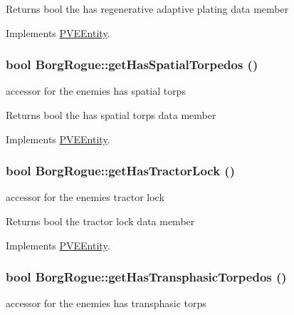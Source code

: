 \begin{DoxyReturn}{Returns}
bool the has regenerative adaptive plating data member 
\end{DoxyReturn}


Implements \hyperlink{classPVEEntity}{PVEEntity}.

\hypertarget{classBorgRogue_ae3dc5dcd0f872f8960799795882231de}{
\subsubsection[{getHasSpatialTorpedos}]{\setlength{\rightskip}{0pt plus 5cm}bool BorgRogue::getHasSpatialTorpedos ()}}
\label{db/d4f/classBorgRogue_ae3dc5dcd0f872f8960799795882231de}
accessor for the enemies has spatial torps

\begin{DoxyReturn}{Returns}
bool the has spatial torps data member 
\end{DoxyReturn}


Implements \hyperlink{classPVEEntity}{PVEEntity}.

\hypertarget{classBorgRogue_aece2200d14e0f1e3056ea52290a39f27}{
\subsubsection[{getHasTractorLock}]{\setlength{\rightskip}{0pt plus 5cm}bool BorgRogue::getHasTractorLock ()}}
\label{db/d4f/classBorgRogue_aece2200d14e0f1e3056ea52290a39f27}
accessor for the enemies tractor lock

\begin{DoxyReturn}{Returns}
bool the tractor lock data member 
\end{DoxyReturn}


Implements \hyperlink{classPVEEntity}{PVEEntity}.

\hypertarget{classBorgRogue_a2b62489036e3bd2e1ce51fbb06f90ec2}{
\subsubsection[{getHasTransphasicTorpedos}]{\setlength{\rightskip}{0pt plus 5cm}bool BorgRogue::getHasTransphasicTorpedos ()}}
\label{db/d4f/classBorgRogue_a2b62489036e3bd2e1ce51fbb06f90ec2}
accessor for the enemies has transphasic torps

